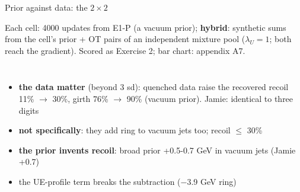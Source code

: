 \documentclass[aspectratio=169,10pt]{beamer}
\newcommand{\suplab}[2]{{\setlength{\fboxsep}{1.2pt}\colorbox{#1!14}{\scriptsize\color{#1!80!black}\textbf{#2}}}}
\newcommand{\HY}{\suplab{cHY}{hybrid}}
\newcommand{\snote}[1]{{\scriptsize\color{ink2}#1\par}}
\newcommand{\fittab}[2]{\resizebox{#1}{!}{}}
\begin{document}
\begin{frame}{Prior against data: the $2 \times 2$}
\begin{center}
\fittab{0.7\textwidth}{tables/prior_data.tex}
\end{center}
\vspace{-0.2em}
\snote{Each cell: 4000 updates from E1-P (a vacuum prior); \HY{}: synthetic sums from the cell's prior +
OT pairs of an independent mixture pool ($\lambda_U = 1$; both reach the gradient). Scored as Exercise 2;
bar chart: appendix A7.}
\vspace{0.3em}
\begin{columns}[T]
\fittab{\linewidth}{tables/prior_data_effects.tex}
\scriptsize
\begin{itemize}\setlength\itemsep{0.15em}
\item \textbf{the data matter} (beyond 3 sd): quenched data raise the recovered recoil 11\% $\to$
  30\%, girth 76\% $\to$ 90\% (vacuum prior). Jamie: identical to three digits
\item \textbf{not specifically}: they add ring to vacuum jets too; recoil $\le$ 30\%
\item \textbf{the prior invents recoil}: broad prior +0.5-0.7 GeV in vacuum jets (Jamie +0.7)
\item the UE-profile term breaks the subtraction ($-$3.9 GeV ring)
\end{itemize}
\end{columns}
\end{frame}
\end{document}
